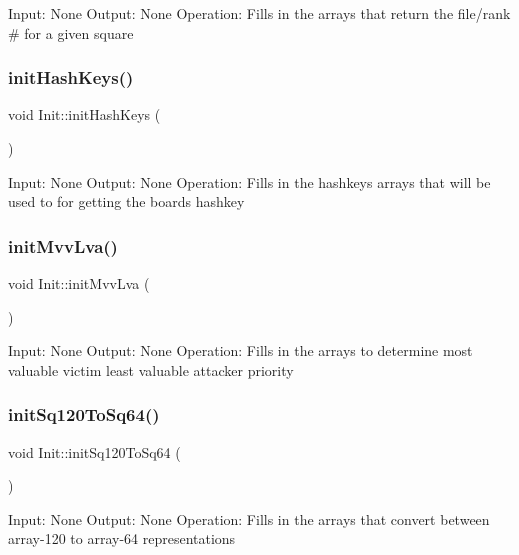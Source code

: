 Input\+: None Output\+: None Operation\+: Fills in the arrays that return the file/rank \# for a given square \mbox{\label{namespaceInit_a746ad8efce2e70882c0b862407056fe5}} 
\subsubsection{\texorpdfstring{init\+Hash\+Keys()}{initHashKeys()}}
{\footnotesize\ttfamily void Init\+::init\+Hash\+Keys (\begin{DoxyParamCaption}{ }\end{DoxyParamCaption})\hspace{0.3cm}{\ttfamily [noexcept]}}

Input\+: None Output\+: None Operation\+: Fills in the hashkeys arrays that will be used to for getting the board\textquotesingle{}s hashkey \mbox{\label{namespaceInit_a87c48a69ce4bce6bd35619d9e9f8aee5}} 
\subsubsection{\texorpdfstring{init\+Mvv\+Lva()}{initMvvLva()}}
{\footnotesize\ttfamily void Init\+::init\+Mvv\+Lva (\begin{DoxyParamCaption}{ }\end{DoxyParamCaption})\hspace{0.3cm}{\ttfamily [noexcept]}}

Input\+: None Output\+: None Operation\+: Fills in the arrays to determine most valuable victim least valuable attacker priority \mbox{\label{namespaceInit_a632a82ed6ce4587f5977a9089477d13a}} 
\subsubsection{\texorpdfstring{init\+Sq120\+To\+Sq64()}{initSq120ToSq64()}}
{\footnotesize\ttfamily void Init\+::init\+Sq120\+To\+Sq64 (\begin{DoxyParamCaption}{ }\end{DoxyParamCaption})\hspace{0.3cm}{\ttfamily [noexcept]}}

Input\+: None Output\+: None Operation\+: Fills in the arrays that convert between array-\/120 to array-\/64 representations 